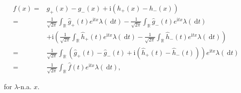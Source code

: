 \documentclass{Class}
\newcommand{\1}{\mathbbm{1}}
\theoremstyle{boxed}
\begin{document}
\begin{enumerate}
  $$
  \begin{aligned}
  f(x)= & g_{+}(x)-g_{-}(x)+\mathrm{i}\left(h_{+}(x)-h_{-}(x)\right) \\
  = & \frac{1}{\sqrt{2 \pi}} \int_{\mathbb{R}} \hat{g}_{+}(t) e^{\mathrm{i} t x} \lambda(\mathrm{~d} t)-\frac{1}{\sqrt{2 \pi}} \int_{\mathbb{R}} \hat{g}_{-}(t) e^{\mathrm{i} t x} \lambda(\mathrm{~d} t) \\
  & +\mathrm{i}\left(\frac{1}{\sqrt{2 \pi}} \int_{\mathbb{R}} \hat{h}_{+}(t) e^{\mathrm{i} t x} \lambda(\mathrm{~d} t)-\frac{1}{\sqrt{2 \pi}} \int_{\mathbb{R}} \hat{h}_{-}(t) e^{\mathrm{i} t x} \lambda(\mathrm{~d} t)\right) \\
  = & \frac{1}{\sqrt{2 \pi}} \int_{\mathbb{R}}\left(\hat{g}_{+}(t)-\hat{g}_{-}(t)+\mathrm{i}\left(\hat{h}_{+}(t)-\hat{h}_{-}(t)\right)\right) e^{\mathrm{i} t x} \lambda(\mathrm{~d} t) \\
  = & \frac{1}{\sqrt{2 \pi}} \int_{\mathbb{R}} \hat{f}(t) e^{\mathrm{i} t x} \lambda(\mathrm{~d} t),
  \end{aligned}
  $$
  
  for $\lambda$-n.a. $x$.
\end{enumerate}
\end{document}
